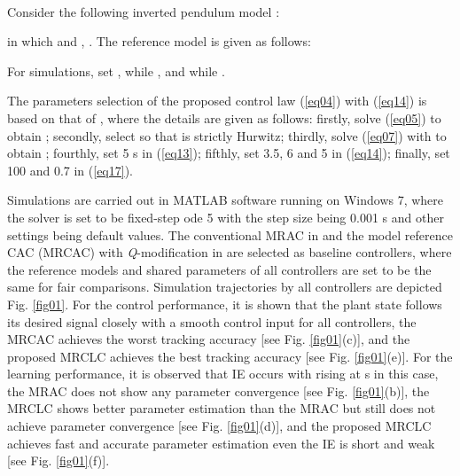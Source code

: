 \documentclass[conference]{IEEEtran}
\begin{document}
\begin{figure*}[!t]
\centering
{}\hfill
{}\hfill
{}\hfill
{}\hfill
{}\hfill
{}\\
\caption{Simulation trajectories by all controllers. (a) Control performance by the MRAC. (b) Learning performance by the MRAC. (c) Control performance by the MRCAC. (d) Learning performance by the MRCAC. (e) Control performance by the MRCLC. (f) Learning performance by the MRCLC.}
\label{fig01}
\end{figure*}

Consider the following inverted pendulum model \cite{Chowdhary2010a}:

in which  and , . The reference model is given as follows:

For simulations, set ,  while , and  while  \cite{Chowdhary2010a}.

The parameters selection of the proposed control law (\ref{eq04}) with (\ref{eq14}) is based on that of \cite{Chowdhary2010a}, where the details are given as follows: firstly, solve (\ref{eq05}) to obtain ; sec\-ondly, select  so that  is strictly Hurwitz; thirdly, solve (\ref{eq07}) with  to obtain ; fourthly, set   5 s in (\ref{eq13}); fifthly, set  3.5,  6 and  5 in (\ref{eq14}); finally, set  100 and  0.7 in (\ref{eq17}).

Simulations are carried out in MATLAB software running on Windows 7, where the solver is set to be fixed-step ode 5 with the step size being 0.001 s and other settings being default values. The conventional MRAC in \cite{Ioannou1996} and the model reference CAC (MRCAC) with \emph{Q}-modification in \cite{Volyanskyy2010} are selected as baseline controllers, where the reference models and shared parameters of all controllers are set to be the same for fair comparisons. Simulation trajectories by all controllers are depicted Fig. \ref{fig01}. For the control performance, it is shown that the plant state  follows its desired signal  closely with a smooth control input  for all controllers, the MRCAC achieves the worst tracking accuracy [see Fig. \ref{fig01}(c)], and the proposed MRCLC achieves the best tracking accuracy [see Fig. \ref{fig01}(e)]. For the learning performance, it is observed that IE occurs with  rising at  s in this case, the MRAC does not show any parameter convergence [see Fig. \ref{fig01}(b)], the MRCLC shows better parameter estimation than the MRAC but still does not achieve parameter convergence [see Fig. \ref{fig01}(d)], and the proposed MRCLC achieves fast and accurate parameter estimation even the IE is short and weak [see Fig. \ref{fig01}(f)].
\end{document}
